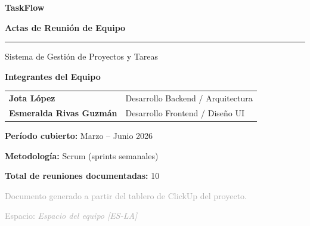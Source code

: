 \documentclass[12pt, a4paper]{article}
\begin{document}
\begin{titlepage}
  \centering
  \vspace*{2cm}
  {\huge\bfseries\color{primary} TaskFlow\par}
  \vspace{0.4cm}
  {\LARGE\bfseries Actas de Reunión de Equipo\par}
  \vspace{0.8cm}
  \textcolor{bordercolor}{\rule{0.6\linewidth}{0.8pt}}\par
  \vspace{0.8cm}
  {\large Sistema de Gestión de Proyectos y Tareas\par}
  \vspace{2cm}

  \begin{mdframed}[
    backgroundcolor=lightblue,
    linecolor=primary,
    linewidth=1.5pt,
    innerleftmargin=20pt, innerrightmargin=20pt,
    innertopmargin=16pt, innerbottommargin=16pt
  ]
    \centering
    \textbf{\large Integrantes del Equipo}\par\vspace{0.5em}
    \begin{tabular}{ll}
      \textbf{Jota López}              & Desarrollo Backend / Arquitectura \\[4pt]
      \textbf{Esmeralda Rivas Guzmán}  & Desarrollo Frontend / Diseño UI   \\
    \end{tabular}
  \end{mdframed}

  \vspace{1.5cm}
  {\large\textbf{Período cubierto:} Marzo -- Junio 2026\par}
  \vspace{0.5cm}
  {\large\textbf{Metodología:} Scrum (sprints semanales)\par}
  \vspace{0.5cm}
  {\large\textbf{Total de reuniones documentadas:} 10\par}
  \vfill
  \textcolor{darkgray}{\small Documento generado a partir del tablero de ClickUp del proyecto.\par
  Espacio: \textit{Espacio del equipo [ES-LA]}}
\end{titlepage}

\tableofcontents
\newpage
\end{document}
